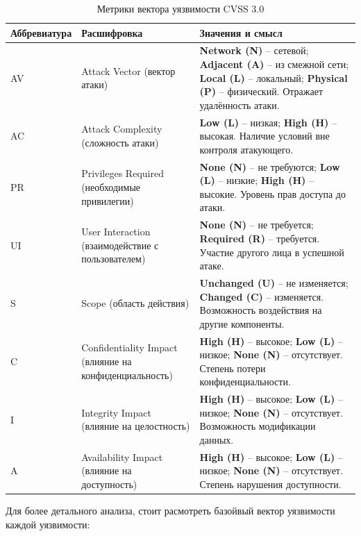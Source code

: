 \documentclass[areasetadvanced]{scrartcl}
\begin{document}
\begin{table}[H]
\centering
\small
\caption{Метрики вектора уязвимости CVSS 3.0}
\label{tab:cvss3}
\begin{tabularx}{\textwidth}{|l|l|X|}
\hline
\textbf{Аббревиатура} & \textbf{Расшифровка} & \textbf{Значения и смысл} \\
\hline
AV  & Attack Vector (вектор атаки) & \textbf{Network (N)} – сетевой; \textbf{Adjacent (A)} – из смежной сети; \textbf{Local (L)} – локальный; \textbf{Physical (P)} – физический. Отражает удалённость атаки. \\
\hline
AC  & Attack Complexity (сложность атаки) & \textbf{Low (L)} – низкая; \textbf{High (H)} – высокая. Наличие условий вне контроля атакующего. \\
\hline
PR  & Privileges Required (необходимые привилегии) & \textbf{None (N)} – не требуются; \textbf{Low (L)} – низкие; \textbf{High (H)} – высокие. Уровень прав доступа до атаки. \\
\hline
UI  & User Interaction (взаимодействие с пользователем) & \textbf{None (N)} – не требуется; \textbf{Required (R)} – требуется. Участие другого лица в успешной атаке. \\
\hline
S   & Scope (область действия) & \textbf{Unchanged (U)} – не изменяется; \textbf{Changed (C)} – изменяется. Возможность воздействия на другие компоненты. \\
\hline
C   & Confidentiality Impact (влияние на конфиденциальность) & \textbf{High (H)} – высокое; \textbf{Low (L)} – низкое; \textbf{None (N)} – отсутствует. Степень потери конфиденциальности. \\
\hline
I   & Integrity Impact (влияние на целостность) & \textbf{High (H)} – высокое; \textbf{Low (L)} – низкое; \textbf{None (N)} – отсутствует. Возможность модификации данных. \\
\hline
A   & Availability Impact (влияние на доступность) & \textbf{High (H)} – высокое; \textbf{Low (L)} – низкое; \textbf{None (N)} – отсутствует. Степень нарушения доступности. \\
\hline
\end{tabularx}
\end{table}


Для более детального анализа, стоит расмотреть базойвый вектор уязвимости каждой уязвимости:
\end{document}
